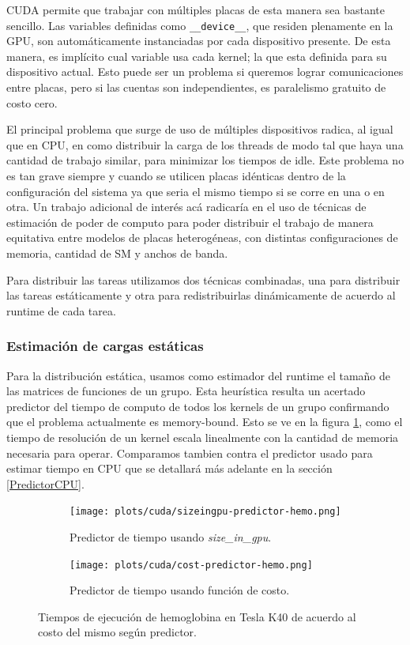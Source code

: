 CUDA permite que trabajar con m\'ultiples placas de esta manera sea bastante sencillo. Las variables
definidas como \texttt{\_\_device\_\_}, que residen plenamente en la GPU, son autom\'aticamente instanciadas
por cada dispositivo presente. De esta manera, es impl\'icito cual variable usa cada kernel; la que
esta definida para su dispositivo actual. Esto puede ser un problema si queremos lograr comunicaciones entre placas,
pero si las cuentas son independientes, es paralelismo gratuito de costo cero.

El principal problema que surge de uso de m\'ultiples dispositivos radica, al igual que en
CPU, en como distribuir la carga de los threads de modo tal que haya una cantidad de trabajo
similar, para minimizar los tiempos de idle. Este problema no es tan grave siempre y cuando
se utilicen placas id\'enticas dentro de la configuraci\'on del sistema ya que seria
el mismo tiempo si se corre en una o en otra. Un trabajo adicional de inter\'es ac\'a
radicar\'ia en el uso de t\'ecnicas de estimaci\'on de poder de computo para poder
distribuir el trabajo de manera equitativa entre modelos de placas heterog\'eneas, con distintas
configuraciones de memoria, cantidad de SM y anchos de banda.

Para distribuir las tareas utilizamos dos t\'ecnicas combinadas, una para distribuir las
tareas est\'aticamente y otra para redistribuirlas din\'amicamente de acuerdo al runtime de
cada tarea.


\subsubsection{Estimaci\'on de cargas est\'aticas}
Para la distribuci\'on est\'atica, usamos como estimador del runtime el tama\~no
de las matrices de funciones de un grupo. Esta heur\'istica resulta un acertado predictor
del tiempo de computo de todos los
kernels de un grupo confirmando que el problema actualmente es memory-bound. Esto se ve en la figura
\ref{plt:runtime-predictor}, como el tiempo de resoluci\'on de un kernel escala linealmente con
la cantidad de memoria necesaria para operar. Comparamos tambien contra el predictor usado
para estimar tiempo en CPU que se detallar\'a m\'as adelante en la secci\'on \ref{PredictorCPU}.

\begin{figure}[htbp]
   \centering
   \begin{subfigure}[b]{\plotwidthtres}
    \texttt{[image: plots/cuda/sizeingpu-predictor-hemo.png]}
     \caption{Predictor de tiempo usando \textit{size\_in\_gpu}.}
   \end{subfigure}
   \begin{subfigure}[b]{\plotwidthtres}
    \texttt{[image: plots/cuda/cost-predictor-hemo.png]}
     \caption{Predictor de tiempo usando funci\'on de costo.}
   \end{subfigure}
   \caption{Tiempos de ejecuci\'on de hemoglobina en Tesla K40 de acuerdo al costo del mismo seg\'un predictor.}
   \label{plt:runtime-predictor}
\end{figure}

